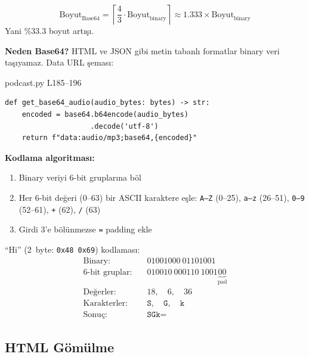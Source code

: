 \begin{formulbox}
\begin{equation}
\label{eq:base64_overhead}
\text{Boyut}_{\text{Base64}} = \left\lceil \frac{4}{3} \cdot \text{Boyut}_{\text{binary}} \right\rceil \approx 1.333 \times \text{Boyut}_{\text{binary}}
\end{equation}
Yani \%33.3 boyut art{\i}\c{s}{\i}.
\end{formulbox}

\textbf{Neden Base64?} HTML ve JSON gibi metin tabanl{\i} formatlar binary veri ta\c{s}{\i}yamaz. Data URL \c{s}emas{\i}:

\begin{kodref}{podcast.py L185--196}
\begin{lstlisting}[caption={Base64 audio d\"{o}n\"{u}\c{s}\"{u}m\"{u}}]
def get_base64_audio(audio_bytes: bytes) -> str:
    encoded = base64.b64encode(audio_bytes)
                    .decode('utf-8')
    return f"data:audio/mp3;base64,{encoded}"
\end{lstlisting}
\end{kodref}

\textbf{Kodlama algoritmas{\i}:}
\begin{enumerate}
  \item Binary veriyi 6-bit gruplar{\i}na b\"{o}l
  \item Her 6-bit de\u{g}eri (0--63) bir ASCII karaktere e\c{s}le: \texttt{A--Z} (0--25), \texttt{a--z} (26--51), \texttt{0--9} (52--61), \texttt{+} (62), \texttt{/} (63)
  \item Girdi 3'e b\"{o}l\"{u}nmezse \texttt{=} padding ekle
\end{enumerate}

\begin{ornek}
``Hi'' (2~byte: \texttt{0x48 0x69}) kodlamas{\i}:
\begin{align*}
\text{Binary:}  &\quad 01001000\ 01101001 \\
\text{6-bit gruplar:}  &\quad 010010\ 000110\ 1001\underbrace{00}_{\text{pad}} \\
\text{De\u{g}erler:}  &\quad 18,\quad 6,\quad 36 \\
\text{Karakterler:}  &\quad \texttt{S},\quad \texttt{G},\quad \texttt{k} \\
\text{Sonu\c{c}:}  &\quad \texttt{SGk=}
\end{align*}
\end{ornek}

\subsection{HTML G\"{o}m\"{u}lme}

